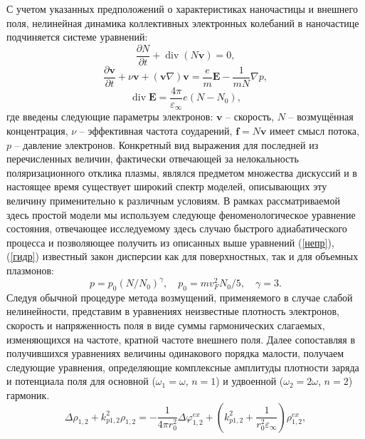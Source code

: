 \documentclass[12pt, a4paper]{article}
\renewcommand{\vec}{\mathbf}
\def \eps {\varepsilon}
\def \w {\omega}
\def \ph {\varphi}
\newcommand{\dt}[1]{\frac{\partial {#1}}{\partial t}}
\begin{document}
С учетом указанных предположений о характеристиках наночастицы и внешнего поля, нелинейная динамика коллективных электронных колебаний в наночастице подчиняется системе уравнений:
\begin{equation} 
	\label{непр}
	\dt{N} + \operatorname{div}(N \vec{v}) = 0,
\end{equation}
\begin{equation} 
	\label{гидр}
	\dt{\vec{v}} + \nu \vec{v} +(\vec{v} \nabla)\vec{v} = \frac{e}{m}\vec{E} - \frac{1}{mN} \nabla p, 
\end{equation}
\begin{equation} 
	\label{максв}
	\operatorname{div}\vec{E} = \frac{4\pi}{\eps_\infty}e(N-N_0),
\end{equation}
где введены следующие параметры электронов: $\vec{v}$ – скорость, $N$ – возмущённая концентрация, $\nu$ – эффективная частота соударений, $\vec{f} = N \vec{v}$ имеет смысл потока, $p$ – давление электронов. Конкретный вид выражения для последней из перечисленных величин, фактически отвечающей за нелокальность поляризационного отклика плазмы, являлся предметом множества дискуссий и в настоящее время существует широкий спектр моделей, описывающих эту величину применительно к различным условиям. В рамках рассматриваемой здесь простой модели мы используем следующе феноменологическое уравнение состояния, отвечающее исследуемому здесь случаю быстрого адиабатического процесса и позволяющее получить из описанных выше уравнений (\ref{непр}), (\ref{гидр}) известный закон дисперсии как для поверхностных, так и для объемных плазмонов: 
\begin{equation}
	\label{p}
 p = p_0 (N/N_0)^\gamma, \quad p_0 = m v_F^2 N_0/5, \quad \gamma = 3.
\end{equation}
Следуя обычной процедуре метода возмущений, применяемого в случае слабой нелинейности, представим в уравнениях неизвестные плотность электронов, скорость и напряженность поля в виде суммы гармонических слагаемых, изменяющихся на частоте, кратной частоте внешнего поля. Далее сопоставляя в получившихся уравнениях величины одинакового порядка малости, получаем следующие уравнения, определяющие комплексные амплитуды плотности заряда и потенциала поля для основной ($\w_1=\w$, $n=1$) и удвоенной ($\w_2=2\w$, $n=2$) гармоник.
\begin{equation} 
	\label{rho_sys}
 \Delta \rho_{1,2} + k_{p1,2}^2\rho_{1,2} = -\frac{1}{4 \pi r_0^2} \Delta \ph^{ex}_{1,2} + \left( k_{p1,2}^2 + \frac{1}{r_0^2\eps_\infty}\right) \rho^{ex}_{1,2},
\end{equation}
\end{document}
